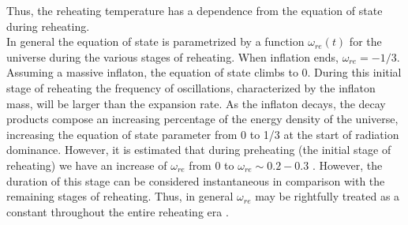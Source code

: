 \documentclass[11pt,a4paper,twoside]{book}
\begin{document}
Thus, the reheating temperature has a dependence from the equation of state during reheating.\\
In general the equation of state is parametrized by a function $\omega_{re}(t)$ for the universe during the various stages of reheating. When inflation ends, $\omega_{re} = -1/3$. Assuming a massive inflaton, the equation of state climbs to 0. During this initial stage of reheating the frequency of oscillations, characterized by the inflaton mass, will be larger than the expansion rate. As the inflaton decays, the decay products compose an increasing percentage of the energy density of the universe,  increasing the equation of state parameter from 0 to 1/3 at the start of radiation dominance. However, it is estimated that during preheating (the initial stage of reheating) we have an increase of $ \omega_{re} $ from 0 to $\omega_{re} \sim 0.2-0.3$ \cite{Chap3:Podolsky_Felder}. However, the duration of this stage can be considered instantaneous in comparison with the remaining stages of reheating. Thus, in general $ \omega_{re} $ may be rightfully treated as a constant throughout the entire reheating era \cite{Chap3:Cook}.
\end{document}
